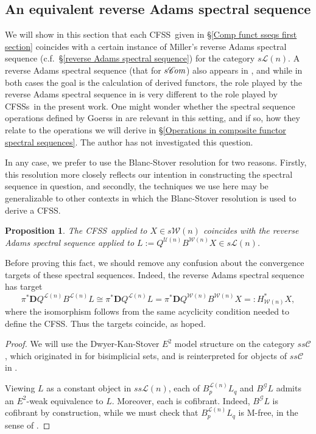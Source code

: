 \documentclass[11pt]{amsart} \renewcommand{\baselinestretch}{1.2}
\theoremstyle{plain}
\newtheorem{prop}[thm]{Proposition}
\numberwithin{equation}{section} %
\theoremstyle{plain}
\newtheorem{prop}[thm]{Proposition}
\numberwithin{equation}{chapter} %
\newcommand{\scrG}{\mathscr{G}}
\newcommand{\scrC}{\mathscr{C}}
\newcommand{\calU}{\mathcal{U}}
\newcommand{\calL}{\mathcal{L}}
\newcommand{\calw}{\mathcal{W}}
\newcommand{\call}{\mathcal{L}}
\newcommand{\calc}{\mathcal{C}}
\newcommand{\citeBOX}[2][]{\cite[\mbox{#1}]{#2}}
\newcommand{\BSW}{{\scrG}}
\newcommand{\algs}{{\scrC\!\textit{\normalfont\textit{om}}}}
\newcommand{\dual}{\mathbf{D}}
\newcommand{\CFSS}{CFSS}
\newcommand{\CFSSs}{CFSSs}
\newcommand{\SubsectionOrSection}[1]{\subsection{#1}}
\begin{document}
\begin{Comp funct sseqs}
\SubsectionOrSection{An equivalent reverse Adams spectral sequence}
\label{An equivalent reverse Adams spectral sequence}
We will show in this section that each \CFSS\ given in \S\ref{Comp funct sseqs first section} coincides with a certain instance of Miller's reverse Adams spectral sequence (c.f.\ \S\ref{reverse Adams spectral sequence}) for the category $s\call(n)$. A reverse Adams spectral sequence (that for $s\algs$) also appears in \cite[Chapter V]{MR1089001}, and while in both cases the goal is the calculation of derived functors, the role played by the reverse Adams spectral sequence in  \cite{MR1089001} is very different to the role played by \CFSSs\ in the present work.
One might wonder whether the spectral sequence operations defined by Goerss in \cite{MR1089001} are relevant in this setting, and if so, how they relate to the operations we will derive in \S\ref{Operations in composite functor spectral sequences}. The author has not investigated this question.


In any case, we prefer to use the Blanc-Stover resolution for two reasons. Firstly, this resolution more closely reflects our intention in constructing the spectral sequence in question, and secondly, the techniques we use here may be generalizable to other contexts in which the Blanc-Stover resolution is used to derive a \CFSS.

\begin{prop}
The \CFSS\ applied to $X\in s\calw(n)$ coincides with the reverse Adams spectral sequence applied to  $L:=Q^{\calU(n)}{ B^{\calw(n)}X}\in s\calL(n)$.
\end{prop}
\noindent Before proving this fact, we should remove any confusion about the convergence targets of these spectral sequences. Indeed, the reverse Adams  spectral sequence has target
\[\pi^*\dual Q^{\calL(n)}B^{\calL(n)}L\cong \pi^*\dual Q^{\calL(n)}L=\pi^*\dual Q^{\calw(n)}B^{\calw(n)}X=:H^*_{\calw(n)}X,\]
where the isomorphism follows from the same acyclicity condition needed to define the \CFSS. Thus the targets coincide, as hoped.
\begin{proof}
We will use the Dwyer-Kan-Stover $E^2$ model structure on the category $ss\calc$, which originated in \cite{DKS.pdf} for bisimplicial sets, and is reinterpreted for objects of $ss\calc$ in \citeBOX[\S4.1.1]{Blanc_Stover-Groth_SS.pdf}.

Viewing $L$ as a constant object in $ss\calL(n)$, each of $B^{\calL(n)}_pL_q$ and $B^{\BSW}L$ admits an $E^2$-weak equivalence to $L$. Moreover, each  is cofibrant. Indeed, $B^{\BSW}L$ is cofibrant by construction, while we must check  that  $B^{\calL(n)}_pL_q$ is M-free, in the sense of \citeBOX[\S4.1.1]{Blanc_Stover-Groth_SS.pdf}.


\end{proof}
\end{Comp funct sseqs}
\end{document}
